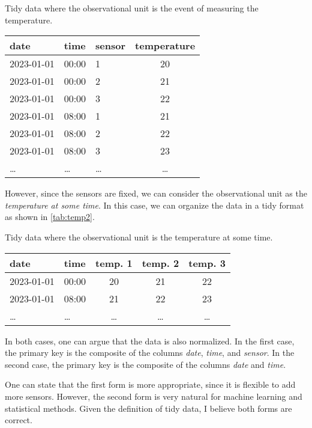 \begin{tablebox}[label=tab:temp1]{Tidy data where the observational unit is the event of measuring the temperature.}
  \centering
  \begin{tabular}{lllc}
    \toprule
    date & time & sensor & temperature \\
    \midrule
    2023-01-01 & 00:00 & 1 & 20 \\
    2023-01-01 & 00:00 & 2 & 21 \\
    2023-01-01 & 00:00 & 3 & 22 \\
    2023-01-01 & 08:00 & 1 & 21 \\
    2023-01-01 & 08:00 & 2 & 22 \\
    2023-01-01 & 08:00 & 3 & 23 \\
    \dots & \dots & \dots & \dots \\
    \bottomrule
  \end{tabular}
\end{tablebox}

However, since the sensors are fixed, we can consider the observational unit as the
\emph{temperature at some time}.  In this case, we can organize the data in a tidy format
as shown in \cref{tab:temp2}.

\begin{tablebox}[label=tab:temp2]{Tidy data where the observational unit is the temperature at some time.}
  \centering
  \begin{tabular}{llccc}
    \toprule
    date & time & temp. 1 & temp. 2 & temp. 3 \\
    \midrule
    2023-01-01 & 00:00 & 20 & 21 & 22 \\
    2023-01-01 & 08:00 & 21 & 22 & 23 \\
    \dots & \dots & \dots & \dots & \dots \\
    \bottomrule
  \end{tabular}
\end{tablebox}

In both cases, one can argue that the data is also normalized.  In the first case, the
primary key is the composite of the columns \emph{date}, \emph{time}, and \emph{sensor}.
In the second case, the primary key is the composite of the columns \emph{date} and
\emph{time}.

One can state that the first form is more appropriate, since it is flexible to add more
sensors.  However, the second form is very natural for machine learning and statistical
methods.  Given the definition of tidy data, I believe both forms are correct.

